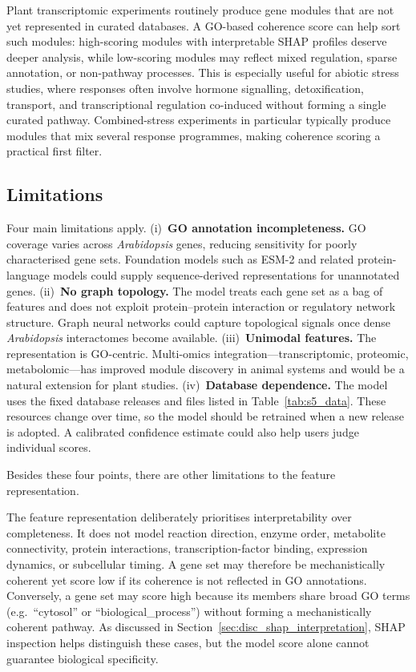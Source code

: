 \documentclass[12pt,twoside]{article}
\begin{document}
Plant transcriptomic experiments routinely produce gene modules that are not yet represented in curated databases. A GO-based coherence score can help sort such modules: high-scoring modules with interpretable SHAP profiles deserve deeper analysis, while low-scoring modules may reflect mixed regulation, sparse annotation, or non-pathway processes. This is especially useful for abiotic stress studies, where responses often involve hormone signalling, detoxification, transport, and transcriptional regulation co-induced without forming a single curated pathway. Combined-stress experiments in particular typically produce modules that mix several response programmes, making coherence scoring a practical first filter.

\subsection{Limitations}
\label{sec:disc_limitations}

Four main limitations apply.
(i)~\textbf{GO annotation incompleteness.}
GO coverage varies across \textit{Arabidopsis} genes, reducing sensitivity for poorly characterised gene sets. Foundation models such as ESM-2 and related protein-language models \citep{lin2023evolutionary} could supply sequence-derived representations for unannotated genes.
(ii)~\textbf{No graph topology.}
The model treats each gene set as a bag of features and does not exploit protein--protein interaction or regulatory network structure. Graph neural networks \citep{muzio2021biological} could capture topological signals once dense \textit{Arabidopsis} interactomes become available.
(iii)~\textbf{Unimodal features.}
The representation is GO-centric. Multi-omics integration---transcriptomic, proteomic, metabolomic---has improved module discovery in animal systems \citep{hasin2017multiomics} and would be a natural extension for plant studies.
(iv)~\textbf{Database dependence.}
The model uses the fixed database releases and files listed in Table~\ref{tab:s5_data}. These resources change over time, so the model should be retrained when a new release is adopted. A calibrated confidence estimate could also help users judge individual scores.

Besides these four points, there are other limitations to the feature representation.

The feature representation deliberately prioritises interpretability over completeness. It does not model reaction direction, enzyme order, metabolite connectivity, protein interactions, transcription-factor binding, expression dynamics, or subcellular timing. A gene set may therefore be mechanistically coherent yet score low if its coherence is not reflected in GO annotations. Conversely, a gene set may score high because its members share broad GO terms (e.g.\ ``cytosol'' or ``biological\_process'') without forming a mechanistically coherent pathway. As discussed in Section~\ref{sec:disc_shap_interpretation}, SHAP inspection helps distinguish these cases, but the model score alone cannot guarantee biological specificity.
\end{document}
